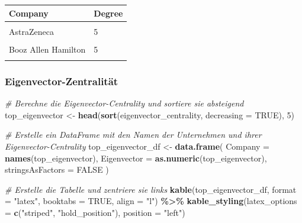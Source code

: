 \documentclass[
]{article}
\newenvironment{Shaded}{\begin{snugshade}}{\end{snugshade}}
\newcommand{\AttributeTok}[1]{\textcolor[rgb]{0.13,0.29,0.53}{#1}}
\newcommand{\CommentTok}[1]{\textcolor[rgb]{0.56,0.35,0.01}{\textit{#1}}}
\newcommand{\ConstantTok}[1]{\textcolor[rgb]{0.56,0.35,0.01}{#1}}
\newcommand{\DecValTok}[1]{\textcolor[rgb]{0.00,0.00,0.81}{#1}}
\newcommand{\FunctionTok}[1]{\textcolor[rgb]{0.13,0.29,0.53}{\textbf{#1}}}
\newcommand{\NormalTok}[1]{#1}
\newcommand{\OtherTok}[1]{\textcolor[rgb]{0.56,0.35,0.01}{#1}}
\newcommand{\SpecialCharTok}[1]{\textcolor[rgb]{0.81,0.36,0.00}{\textbf{#1}}}
\newcommand{\StringTok}[1]{\textcolor[rgb]{0.31,0.60,0.02}{#1}}
\begin{document}
\begin{tabular}{ll}
\toprule
Company & Degree\\
\midrule
\cellcolor{gray!10}{Accenture} & \cellcolor{gray!10}{7}\\
AstraZeneca & 5\\
\cellcolor{gray!10}{Infosys} & \cellcolor{gray!10}{5}\\
Booz Allen Hamilton & 5\\
\cellcolor{gray!10}{BioMarin Pharmaceutical} & \cellcolor{gray!10}{4}\\
\bottomrule
\end{tabular}

\subsubsection{Eigenvector-Zentralität}\label{eigenvector-zentralituxe4t}

\begin{Shaded}
\begin{Highlighting}[]
\CommentTok{\# Berechne die Eigenvector{-}Centrality und sortiere sie absteigend}
\NormalTok{top\_eigenvector }\OtherTok{\textless{}{-}} \FunctionTok{head}\NormalTok{(}\FunctionTok{sort}\NormalTok{(eigenvector\_centrality, }\AttributeTok{decreasing =} \ConstantTok{TRUE}\NormalTok{), }\DecValTok{5}\NormalTok{)}

\CommentTok{\# Erstelle ein DataFrame mit den Namen der Unternehmen und ihrer Eigenvector{-}Centrality}
\NormalTok{top\_eigenvector\_df }\OtherTok{\textless{}{-}} \FunctionTok{data.frame}\NormalTok{(}
  \AttributeTok{Company =} \FunctionTok{names}\NormalTok{(top\_eigenvector),}
  \AttributeTok{Eigenvector =} \FunctionTok{as.numeric}\NormalTok{(top\_eigenvector),}
  \AttributeTok{stringsAsFactors =} \ConstantTok{FALSE}
\NormalTok{)}

\CommentTok{\# Erstelle die Tabelle und zentriere sie links}
\FunctionTok{kable}\NormalTok{(top\_eigenvector\_df, }\AttributeTok{format =} \StringTok{"latex"}\NormalTok{, }\AttributeTok{booktabs =} \ConstantTok{TRUE}\NormalTok{, }\AttributeTok{align =} \StringTok{"l"}\NormalTok{) }\SpecialCharTok{\%\textgreater{}\%}
  \FunctionTok{kable\_styling}\NormalTok{(}\AttributeTok{latex\_options =} \FunctionTok{c}\NormalTok{(}\StringTok{"striped"}\NormalTok{, }\StringTok{"hold\_position"}\NormalTok{), }\AttributeTok{position =} \StringTok{"left"}\NormalTok{)}
\end{Highlighting}
\end{Shaded}
\end{document}
